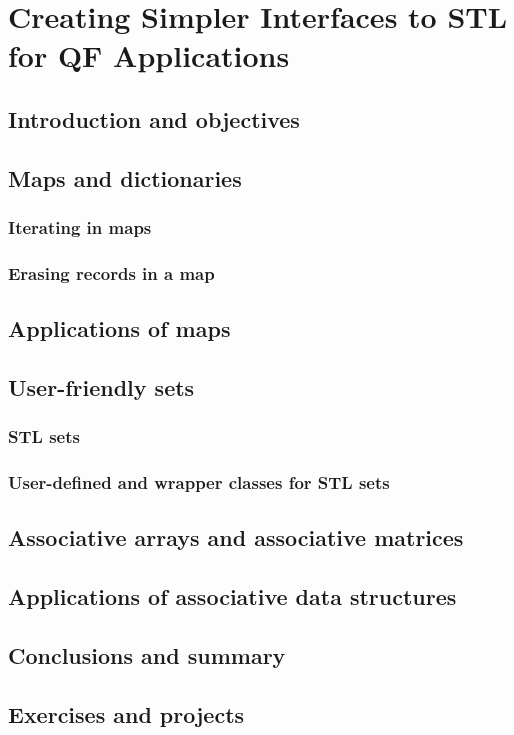 \chapter{Creating Simpler Interfaces to STL for QF Applications}

\section{Introduction and objectives}
\section{Maps and dictionaries}

\subsection{Iterating in maps}
\subsection{Erasing records in a map}

\section{Applications of maps}
\section{User-friendly sets}

\subsection{STL sets}
\subsection{User-defined and wrapper classes for STL sets}

\section{Associative arrays and associative matrices}
\section{Applications of associative data structures}
\section{Conclusions and summary}
\section{Exercises and projects}